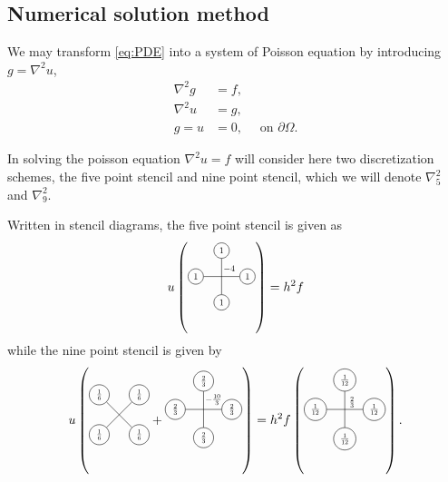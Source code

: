 
\subsection{Numerical solution method}

We may transform \eqref{eq:PDE} into a system of Poisson equation by introducing $g = \nabla^2 u$,
\begin{align}\label{eq:PDE-poisson}
  \nabla^2g &= f,\\
  \nabla^2u &= g,\\
  g = u &= 0,\quad \text{ on } \partial \Omega.
\end{align}


In solving the poisson equation $\nabla^2 u = f$ will consider here two discretization schemes, the five point stencil and nine point stencil, which we will denote $\nabla_5^2$ and $\nabla_9^2$.

\newcommand{\crossStencil}[5]{%
  \begin{tikzpicture}[scale=0.5,baseline=1mm, every node/.style={scale=0.7}, nodes={draw, circle}]
    \draw node[below]{$#1$} (0,0) -- (0,2) node[above]{$#2$};
    \draw (-1, 1) node[left]{$#3$} -- (1, 1) node[right]{$#4$};
    \node[above right, draw=none] at (0,1) {$#5$};
  \end{tikzpicture}
}

\newcommand{\xStencil}[4]{%
  \begin{tikzpicture}[scale=0.5,baseline=1mm, every node/.style={scale=0.7}, nodes={draw, circle}]
    \draw node[below left]{$#1$} (0,0) -- (1.41, 1.41) node[above right]{$#2$};
    \draw (0, 1.41) node[above left]{$#3$} -- (1.41, 0) node[below right]{$#4$};
  \end{tikzpicture}
}

Written in stencil diagrams, the five point stencil is given as 
$$
u \left(\crossStencil{1}{1}{1}{1}{-4}\right) = h^2 f
$$
while the nine point stencil is given by
$$
u
\left(
\xStencil{\frac16}{\frac16}{\frac16}{\frac16}
+
\crossStencil{\frac23}{\frac23}{\frac23}{\frac23}{-\frac{10}{3}}
\right)
=
h^2
f
\left(
\crossStencil{\frac1{12}}{\frac1{12}}{\frac1{12}}{\frac1{12}}{\frac23}
\right).
$$



